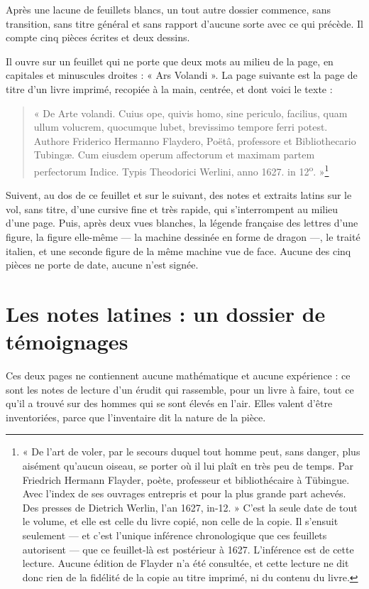 \documentclass[11pt,a4paper]{article}
\begin{document}
Après une lacune de feuillets blancs, un tout autre dossier commence, sans
transition, sans titre général et sans rapport d'aucune sorte avec ce qui
précède. Il compte cinq pièces écrites et deux dessins.

Il ouvre sur un feuillet qui ne porte que deux mots au milieu de la page, en
capitales et minuscules droites : « Ars Volandi ». La page suivante est la page
de titre d'un livre imprimé, recopiée à la main, centrée, et dont voici le texte :

\begin{quote}
« De Arte volandi. Cuius ope, quivis homo, sine periculo, facilius, quam ullum
volucrem, quocumque lubet, brevissimo tempore ferri potest. Authore Friderico
Hermanno Flaydero, Poëtâ, professore et Bibliothecario Tubingæ. Cum eiusdem
operum affectorum et maximam partem perfectorum Indice. Typis Theodorici
Werlini, anno 1627. in 12\textsuperscript{o}. »\footnote{« De l'art de voler, par
le secours duquel tout homme peut, sans danger, plus aisément qu'aucun oiseau,
se porter où il lui plaît en très peu de temps. Par Friedrich Hermann Flayder,
poète, professeur et bibliothécaire à Tübingue. Avec l'index de ses ouvrages
entrepris et pour la plus grande part achevés. Des presses de Dietrich Werlin,
l'an 1627, in-12. » C'est la seule date de tout le volume, et elle est celle du
livre copié, non celle de la copie. Il s'ensuit seulement — et c'est l'unique
inférence chronologique que ces feuillets autorisent — que ce feuillet-là est
postérieur à 1627. L'inférence est de cette lecture. Aucune édition de Flayder
n'a été consultée, et cette lecture ne dit donc rien de la fidélité de la copie
au titre imprimé, ni du contenu du livre.}
\end{quote}

Suivent, au dos de ce feuillet et sur le suivant, des notes et extraits latins
sur le vol, sans titre, d'une cursive fine et très rapide, qui s'interrompent au
milieu d'une page. Puis, après deux vues blanches, la légende française des
lettres d'une figure, la figure elle-même — la machine dessinée en forme de
dragon —, le traité italien, et une seconde figure de la même machine vue de
face. Aucune des cinq pièces ne porte de date, aucune n'est signée.

\section*{Les notes latines : un dossier de témoignages}

Ces deux pages ne contiennent aucune mathématique et aucune expérience : ce sont
les notes de lecture d'un érudit qui rassemble, pour un livre à faire, tout ce
qu'il a trouvé sur des hommes qui se sont élevés en l'air. Elles valent d'être
inventoriées, parce que l'inventaire dit la nature de la pièce.
\end{document}
